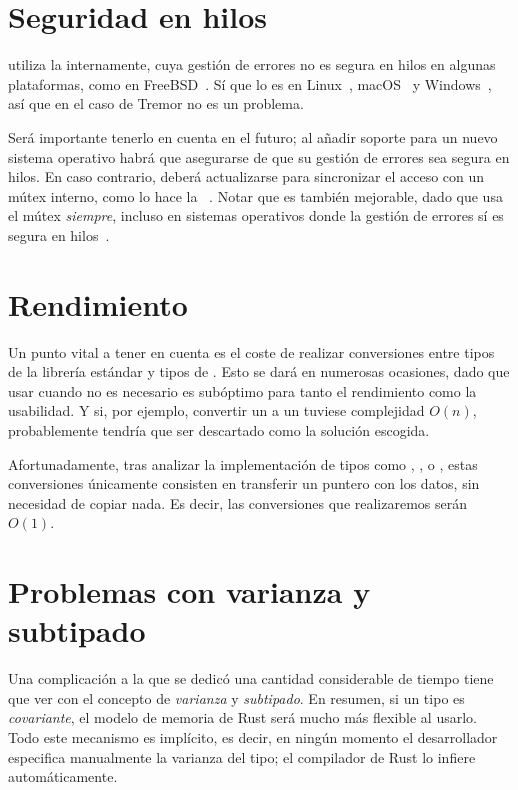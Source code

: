 \section{Seguridad en hilos}

\abistable utiliza la \crate {} internamente, cuya gestión
de errores no es segura en hilos en algunas plataformas, como  en
FreeBSD~\cite{thsafe_libloading}\cite{thsafe_openbsd}. Sí que lo es en
Linux~\cite{thsafe_linux}, macOS~\cite{thsafe_macos} y Windows~\cite{thsafe_ms},
así que en el caso de Tremor no es un problema.

Será importante tenerlo en cuenta en el futuro; al añadir soporte para un nuevo
sistema operativo habrá que asegurarse de que su gestión de errores sea segura
en hilos. En caso contrario, deberá actualizarse  para
sincronizar el acceso con un mútex interno, como lo hace la \crate
{}~\cite{thsafe_dlopen}. Notar que  es también
mejorable, dado que usa el mútex \emph{siempre}, incluso en sistemas operativos
donde la gestión de errores sí es segura en hilos~\cite{thsafe_dlopen_issue}.

\section{Rendimiento}\label{abiperf}

Un punto vital a tener en cuenta es el coste de realizar conversiones entre
tipos de la librería estándar y tipos de \abistable. Esto se dará en numerosas
ocasiones, dado que usar \abistable cuando no es necesario es subóptimo para
tanto el rendimiento como la usabilidad. Y si, por ejemplo, convertir un
 a un  tuviese complejidad $O(n)$, probablemente
\abistable tendría que ser descartado como la solución escogida.

Afortunadamente, tras analizar la implementación de tipos como ,
,  o , estas conversiones únicamente
consisten en transferir un puntero con los datos, sin necesidad de copiar nada.
Es decir, las conversiones que realizaremos serán $O(1)$.

\section{Problemas con varianza y subtipado}

Una complicación a la que se dedicó una cantidad considerable de tiempo tiene
que ver con el concepto de \emph{varianza} y \emph{subtipado}. En resumen, si un
tipo es \emph{covariante}, el modelo de memoria de Rust será mucho más flexible
al usarlo. Todo este mecanismo es implícito, es decir, en ningún momento el
desarrollador especifica manualmente la varianza del tipo; el compilador de Rust
lo infiere automáticamente.

